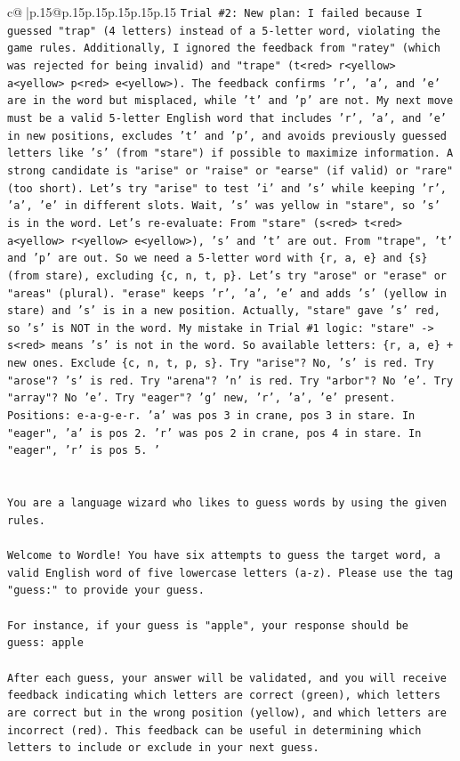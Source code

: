 \documentclass{article}
\begin{document}
{\begin{supertabular}{c@{$\;$}|p{.15\linewidth}@{}p{.15\linewidth}p{.15\linewidth}p{.15\linewidth}p{.15\linewidth}p{.15\linewidth}}
{{{\texttt{Trial \#2: New plan: I failed because I guessed "trap" (4 letters) instead of a 5{-}letter word, violating the game rules. Additionally, I ignored the feedback from "ratey" (which was rejected for being invalid) and "trape" (t<red> r<yellow> a<yellow> p<red> e<yellow>). The feedback confirms 'r', 'a', and 'e' are in the word but misplaced, while 't' and 'p' are not. My next move must be a valid 5{-}letter English word that includes 'r', 'a', and 'e' in new positions, excludes 't' and 'p', and avoids previously guessed letters like 's' (from "stare") if possible to maximize information. A strong candidate is "arise" or "raise" or "earse" (if valid) or "rare" (too short). Let's try "arise" to test 'i' and 's' while keeping 'r', 'a', 'e' in different slots. Wait, 's' was yellow in "stare", so 's' is in the word. Let's re{-}evaluate: From "stare" (s<red> t<red> a<yellow> r<yellow> e<yellow>), 's' and 't' are out. From "trape", 't' and 'p' are out. So we need a 5{-}letter word with \{r, a, e\} and \{s\} (from stare), excluding \{c, n, t, p\}. Let's try "arose" or "erase" or "areas" (plural). "erase" keeps 'r', 'a', 'e' and adds 's' (yellow in stare) and 's' is in a new position. Actually, "stare" gave 's' red, so 's' is NOT in the word. My mistake in Trial \#1 logic: "stare" {-}> s<red> means 's' is not in the word. So available letters: \{r, a, e\} + new ones. Exclude \{c, n, t, p, s\}. Try "arise"? No, 's' is red. Try "arose"? 's' is red. Try "arena"? 'n' is red. Try "arbor"? No 'e'. Try "array"? No 'e'. Try "eager"? 'g' new, 'r', 'a', 'e' present. Positions: e{-}a{-}g{-}e{-}r. 'a' was pos 3 in crane, pos 3 in stare. In "eager", 'a' is pos 2. 'r' was pos 2 in crane, pos 4 in stare. In "eager", 'r' is pos 5. '} \\
\\ 
\\ 
\texttt{You are a language wizard who likes to guess words by using the given rules.} \\
\\ 
\texttt{Welcome to Wordle! You have six attempts to guess the target word, a valid English word of five lowercase letters (a{-}z). Please use the tag "guess:" to provide your guess.} \\
\\ 
\texttt{For instance, if your guess is "apple", your response should be} \\
\texttt{guess: apple} \\
\\ 
\texttt{After each guess, your answer will be validated, and you will receive feedback indicating which letters are correct (green), which letters are correct but in the wrong position (yellow), and which letters are incorrect (red). This feedback can be useful in determining which letters to include or exclude in your next guess.} \\
}}}
\end{supertabular}}
\end{document}
